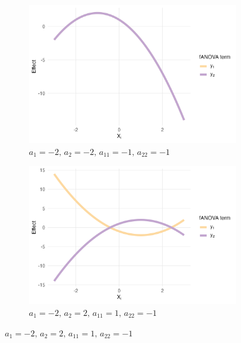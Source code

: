 \begin{figure}[htpb]
    \centering
    \begin{subfigure}[t]{0.49\textwidth}
        \centering
        \includegraphics[width=\textwidth]{images/experiment_section/mixed_a1m20_a2m20_a11m10_a22m10_a12p00_rhop00_main.png}
        \caption{$a_1=-2,\, a_2=-2,\, a_{11}=-1,\, a_{22}=-1$}
        \label{fig:mixed_rho_0_panel1}
    \end{subfigure}%
    \hfill
    \begin{subfigure}[t]{0.49\textwidth}
        \centering
        \includegraphics[width=\textwidth]{images/experiment_section/mixed_a1m20_a2p20_a11p10_a22m10_a12p00_rhop00_main.png}
        \caption{$a_1=-2,\, a_2=2,\, a_{11}=1,\, a_{22}=-1$}
        \label{fig:mixed_rho_0_panel2}
    \end{subfigure}


\end{figure}
